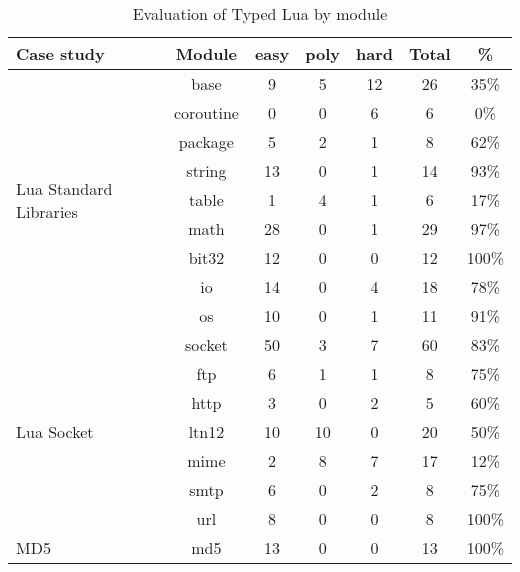 \begin{table}[!ht]
\begin{center}
\begin{tabular}{|l|c|c|c|c|c|c|}
\hline
\textbf{Case study} & \textbf{Module} & \textbf{easy} & \textbf{poly} & \textbf{hard} & \textbf{Total} & \textbf{\%} \\
\hline
\multirow{9}{*}{Lua Standard Libraries}
& base & 9 & 5 & 12 & 26 & 35\% \\
\cline{2-7}
& coroutine & 0 & 0 & 6 & 6 & 0\% \\
\cline{2-7}
& package & 5 & 2 & 1 & 8 & 62\% \\
\cline{2-7}
& string & 13 & 0 & 1 & 14 & 93\% \\
\cline{2-7}
& table & 1 & 4 & 1 & 6 & 17\% \\
\cline{2-7}
& math & 28 & 0 & 1 & 29 & 97\% \\
\cline{2-7}
& bit32 & 12 & 0 & 0 & 12 & 100\% \\
\cline{2-7}
& io & 14 & 0 & 4 & 18 & 78\% \\
\cline{2-7}
& os & 10 & 0 & 1 & 11 & 91\% \\
\hline
\multirow{7}{*}{Lua Socket}
& socket & 50 & 3 & 7 & 60 & 83\% \\
\cline{2-7}
& ftp & 6 & 1 & 1 & 8 & 75\% \\
\cline{2-7}
& http & 3 & 0 & 2 & 5 & 60\% \\
\cline{2-7}
& ltn12 & 10 & 10 & 0 & 20 & 50\% \\
\cline{2-7}
& mime & 2 & 8 & 7 & 17 & 12\% \\
\cline{2-7}
& smtp & 6 & 0 & 2 & 8 & 75\% \\
\cline{2-7}
& url & 8 & 0 & 0 & 8 & 100\% \\
\hline
\multirow{1}{*}{MD5}
& md5 & 13 & 0 & 0 & 13 & 100\% \\
\hline
\end{tabular}
\end{center}
\caption{Evaluation of Typed Lua by module}
\label{tab:evalbymod}
\end{table}
